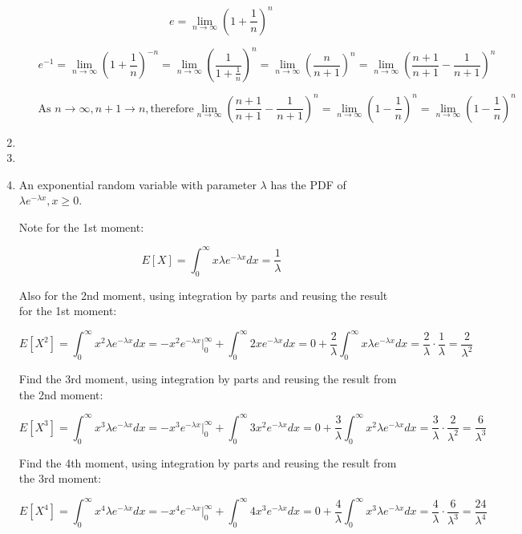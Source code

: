 \documentclass[11pt,letterpaper,titlepage]{article}
\begin{document}
\begin{enumerate}
\begin{enumerate}
        $$ e = \lim_{n\to\infty} (1 + \frac{1}{n})^n $$
        
        $$ e^{-1} = \lim_{n\to\infty} (1 + \frac{1}{n})^{-n} = \lim_{n\to\infty} (\frac{1}{1+\frac{1}{n}})^{n} = \lim_{n\to\infty} (\frac{n}{n+1})^{n} = \lim_{n\to\infty} (\frac{n+1}{n+1} - \frac{1}{n+1})^{n} $$
        
        $$ \text{As } n \to\infty, n+1 \to n, \text{therefore} \lim_{n\to\infty} (\frac{n+1}{n+1} - \frac{1}{n+1})^{n} = \lim_{n\to\infty} (1 - \frac{1}{n})^{n} = \lim_{n\to\infty} (1-\frac{1}{n})^n $$ 
        
    \end{enumerate}
    
    \item
    
    \item 
    
    \item An exponential random variable with parameter $ \lambda $ has the PDF of $ \lambda e^{-\lambda x}, x \geq 0 $.
    
    Note for the 1st moment:
    
    $$ E[X] = \int_{0}^{\infty} x \lambda e^{-\lambda x} dx = \frac{1}{\lambda} $$
    
    Also for the 2nd moment, using integration by parts and reusing the result for the 1st moment:
    
    $$ E[X^2] = \int_{0}^{\infty} x^2 \lambda e^{-\lambda x} dx = -x^2 e^{-\lambda x}\Big|_{0}^{\infty} + \int_{0}^{\infty} 2x e^{-\lambda x} dx = 0 + \frac{2}{\lambda} \int_{0}^{\infty} x \lambda e^{-\lambda x} dx = \frac{2}{\lambda} \cdot \frac{1}{\lambda} = \frac{2}{\lambda^2} $$

    Find the 3rd moment, using integration by parts and reusing the result from the 2nd moment:
    
    $$ E[X^3] = \int_{0}^{\infty} x^3 \lambda e^{-\lambda x} dx = -x^3 e^{-\lambda x}\Big|_{0}^{\infty} + \int_{0}^{\infty} 3x^2 e^{-\lambda x} dx =  0 + \frac{3}{\lambda} \int_{0}^{\infty} x^2 \lambda e^{-\lambda x} dx = \frac{3}{\lambda} \cdot \frac{2}{\lambda^2} = \frac{6}{\lambda^3} $$
    
    Find the 4th moment, using integration by parts and reusing the result from the 3rd moment:
    
    $$ E[X^4] = \int_{0}^{\infty} x^4 \lambda e^{-\lambda x} dx  = -x^4 e^{-\lambda x}\Big|_{0}^{\infty} + \int_{0}^{\infty} 4 x^3 e^{-\lambda x} dx  =   0 + \frac{4}{\lambda} \int_{0}^{\infty} x^3 \lambda e^{-\lambda x} dx = \frac{4}{\lambda} \cdot \frac{6}{\lambda^3} = \frac{24}{\lambda^4} $$
    

\end{enumerate}
\end{document}
